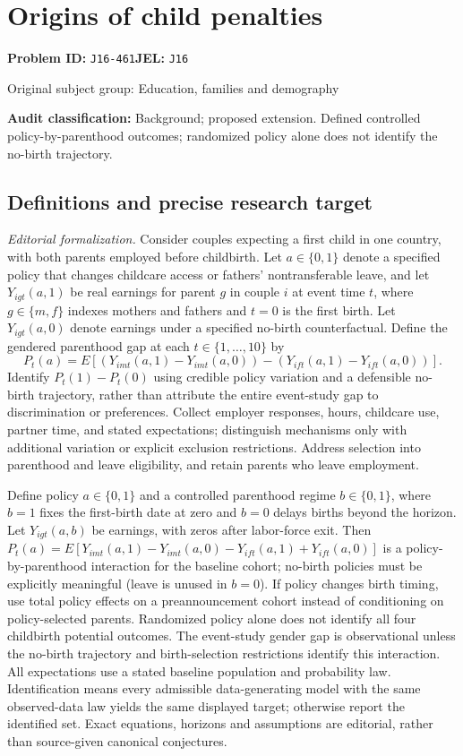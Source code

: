 \documentclass[11pt,a4paper]{article}
\begin{document}
\section*{Origins of child penalties}
\textbf{Problem ID:} \texttt{J16-461}\quad \textbf{JEL:} \texttt{J16}\par
\label{problem:OP-0457}
{\sffamily\small\color{muted}Original subject group: Education, families and demography\par}
\label{definitions:problem:30007739}
\textbf{Audit classification:} Background; proposed extension. Defined controlled policy-by-parenthood outcomes; randomized policy alone does not identify the no-birth trajectory.
\subsection*{Definitions and precise research target}
\textit{Editorial formalization.} Consider couples expecting a first child in one country, with both parents employed before childbirth. Let \(a\in\{0,1\}\) denote a specified policy that changes childcare access or fathers’ nontransferable leave, and let \(Y_{igt}(a,1)\) be real earnings for parent \(g\) in couple \(i\) at event time \(t\), where \(g\in\{m,f\}\) indexes mothers and fathers and \(t=0\) is the first birth. Let \(Y_{igt}(a,0)\) denote earnings under a specified no-birth counterfactual. Define the gendered parenthood gap at each \(t\in\{1,\ldots,10\}\) by
\[P_t(a)=E[(Y_{imt}(a,1)-Y_{imt}(a,0))-(Y_{ift}(a,1)-Y_{ift}(a,0))].\]
Identify \(P_t(1)-P_t(0)\) using credible policy variation and a defensible no-birth trajectory, rather than attribute the entire event-study gap to discrimination or preferences. Collect employer responses, hours, childcare use, partner time, and stated expectations; distinguish mechanisms only with additional variation or explicit exclusion restrictions. Address selection into parenthood and leave eligibility, and retain parents who leave employment.

Define policy \(a\in\{0,1\}\) and a controlled parenthood regime \(b\in\{0,1\}\), where \(b=1\) fixes the first-birth date at zero and \(b=0\) delays births beyond the horizon. Let \(Y_{igt}(a,b)\) be earnings, with zeros after labor-force exit. Then \(P_t(a)=E[Y_{imt}(a,1)-Y_{imt}(a,0)-Y_{ift}(a,1)+Y_{ift}(a,0)]\) is a policy-by-parenthood interaction for the baseline cohort; no-birth policies must be explicitly meaningful (leave is unused in \(b=0\)). If policy changes birth timing, use total policy effects on a preannouncement cohort instead of conditioning on policy-selected parents. Randomized policy alone does not identify all four childbirth potential outcomes. The event-study gender gap is observational unless the no-birth trajectory and birth-selection restrictions identify this interaction. All expectations use a stated baseline population and probability law. Identification means every admissible data-generating model with the same observed-data law yields the same displayed target; otherwise report the identified set. Exact equations, horizons and assumptions are editorial, rather than source-given canonical conjectures.
\end{document}
